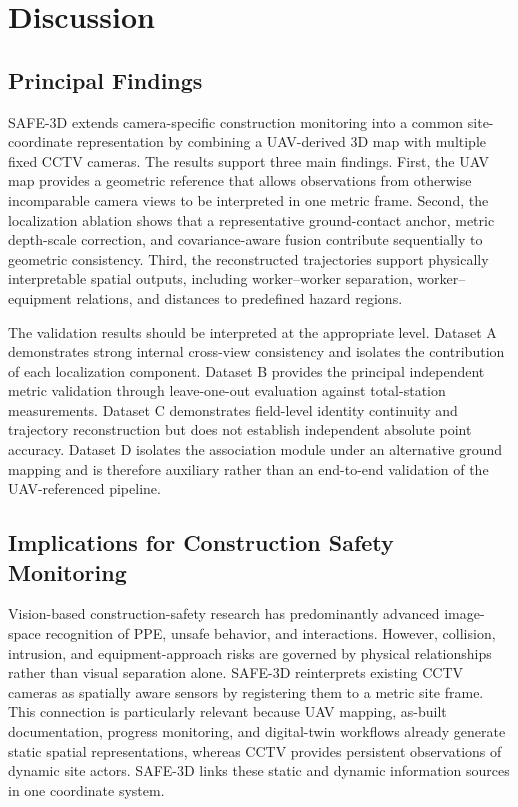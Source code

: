 \section{Discussion}
\label{sec:discussion}

\subsection{Principal Findings}
SAFE-3D extends camera-specific construction monitoring into a common site-coordinate representation by combining a UAV-derived 3D map with multiple fixed CCTV cameras. The results support three main findings. First, the UAV map provides a geometric reference that allows observations from otherwise incomparable camera views to be interpreted in one metric frame. Second, the localization ablation shows that a representative ground-contact anchor, metric depth-scale correction, and covariance-aware fusion contribute sequentially to geometric consistency. Third, the reconstructed trajectories support physically interpretable spatial outputs, including worker--worker separation, worker--equipment relations, and distances to predefined hazard regions.

The validation results should be interpreted at the appropriate level. Dataset A demonstrates strong internal cross-view consistency and isolates the contribution of each localization component. Dataset B provides the principal independent metric validation through leave-one-out evaluation against total-station measurements. Dataset C demonstrates field-level identity continuity and trajectory reconstruction but does not establish independent absolute point accuracy. Dataset D isolates the association module under an alternative ground mapping and is therefore auxiliary rather than an end-to-end validation of the UAV-referenced pipeline.

\subsection{Implications for Construction Safety Monitoring}
Vision-based construction-safety research has predominantly advanced image-space recognition of PPE, unsafe behavior, and interactions. However, collision, intrusion, and equipment-approach risks are governed by physical relationships rather than visual separation alone. SAFE-3D reinterprets existing CCTV cameras as spatially aware sensors by registering them to a metric site frame. This connection is particularly relevant because UAV mapping, as-built documentation, progress monitoring, and digital-twin workflows already generate static spatial representations, whereas CCTV provides persistent observations of dynamic site actors. SAFE-3D links these static and dynamic information sources in one coordinate system.


